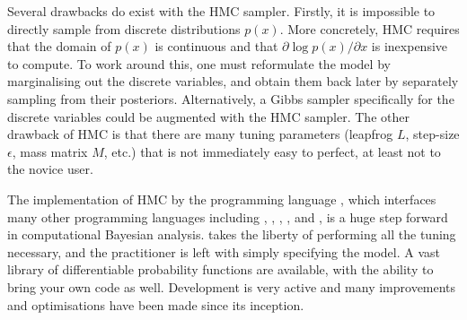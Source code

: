 Several drawbacks do exist with the HMC sampler. Firstly, it is impossible to directly sample from discrete distributions $p(x)$.
More concretely, HMC requires that the domain of $p(x)$ is continuous and that $\partial \log p(x) / \partial x$ is inexpensive to compute.
To work around this, one must reformulate the model by marginalising out the discrete variables, and obtain them back later by separately sampling from their posteriors.
Alternatively, a Gibbs sampler specifically for the discrete variables could be augmented with the HMC sampler.
The other drawback of HMC is that there are many tuning parameters (leapfrog $L$, step-size $\epsilon$, mass matrix $M$, etc.)  that is not immediately easy to perfect, at least not to the novice user. 

The implementation of HMC by the programming language , which interfaces many other programming languages including , , , ,  and , is a huge step forward in computational Bayesian analysis.
 takes the liberty of performing all the tuning necessary, and the practitioner is left with simply specifying the model. 
A vast library of differentiable probability functions are available, with the ability to bring your own code as well.
Development is very active and many improvements and optimisations have been made since its inception.

